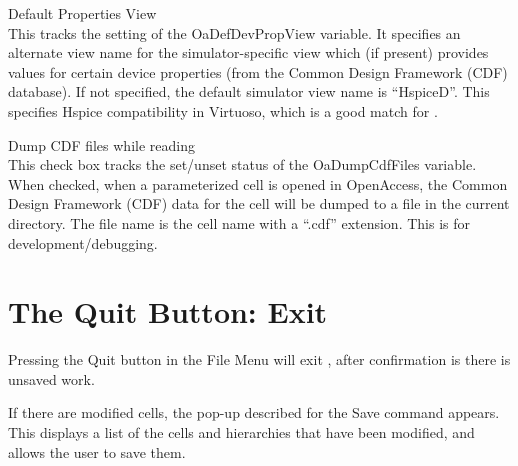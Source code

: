 \begin{description}
\item{\cb Default Properties View}\\
This tracks the setting of the {\et OaDefDevPropView} variable.  It
specifies an alternate view name for the simulator-specific view which
(if present) provides values for certain device properties (from the
Common Design Framework (CDF) database).  If not specified, the
default simulator view name is ``{\vt HspiceD}''.  This specifies
Hspice compatibility in Virtuoso, which is a good match for
{\WRspice}.

\item{\cb Dump CDF files while reading}\\
This check box tracks the set/unset status of the {\et OaDumpCdfFiles}
variable.  When checked, when a parameterized cell is opened in
OpenAccess, the Common Design Framework (CDF) data for the cell will
be dumped to a file in the current directory.  The file name is the
cell name with a ``{\vt .cdf}'' extension.  This is for
development/debugging.
\end{description}
\fi


\section{The {\cb Quit} Button: Exit {\Xic}}

Pressing the {\cb Quit} button in the {\cb File Menu} will exit
{\Xic}, after confirmation is there is unsaved work.

If there are modified cells, the pop-up described for the {\cb Save}
command appears.  This displays a list of the cells and hierarchies
that have been modified, and allows the user to save them.

